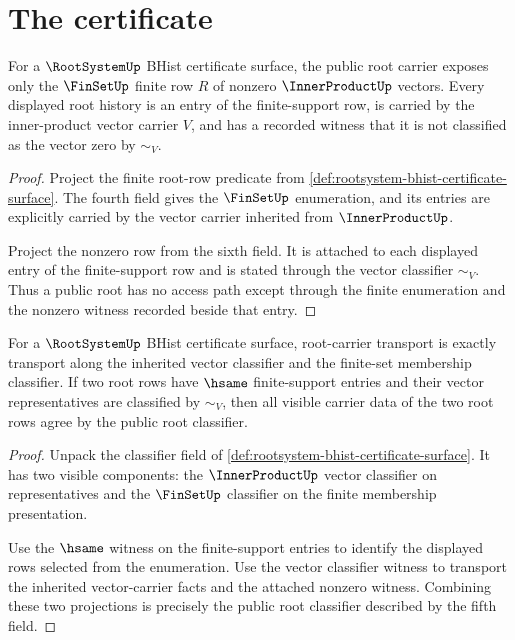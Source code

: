 \section{The certificate}
\label{sec:rootsystem-certificate}

\begin{theorem}
\label{thm:rootsystem-nonzero-finiteness-obligation}
For a $\RootSystemUp$ BHist certificate surface, the public root carrier
exposes only the $\FinSetUp$ finite row $R$ of nonzero
$\InnerProductUp$ vectors. Every displayed root history is an entry of the
finite-support row, is carried by the inner-product vector carrier $V$, and
has a recorded witness that it is not classified as the vector zero by
$\sim_V$.
\end{theorem}
\begin{proof}
Project the finite root-row predicate from
\autoref{def:rootsystem-bhist-certificate-surface}. The fourth field gives
the $\FinSetUp$ enumeration, and its entries are explicitly carried by the
vector carrier inherited from $\InnerProductUp$.

Project the nonzero row from the sixth field. It is attached to each displayed
entry of the finite-support row and is stated through the vector classifier
$\sim_V$. Thus a public root has no access path except through the finite
enumeration and the nonzero witness recorded beside that entry.
\end{proof}

\begin{theorem}
\label{thm:rootsystem-carrier-classifier-obligation}
For a $\RootSystemUp$ BHist certificate surface, root-carrier transport is
exactly transport along the inherited vector classifier and the finite-set
membership classifier. If two root rows have $\hsame$ finite-support entries
and their vector representatives are classified by $\sim_V$, then all visible
carrier data of the two root rows agree by the public root classifier.
\end{theorem}
\begin{proof}
Unpack the classifier field of
\autoref{def:rootsystem-bhist-certificate-surface}. It has two visible
components: the $\InnerProductUp$ vector classifier on representatives and
the $\FinSetUp$ classifier on the finite membership presentation.

Use the $\hsame$ witness on the finite-support entries to identify the
displayed rows selected from the enumeration. Use the vector classifier
witness to transport the inherited vector-carrier facts and the attached
nonzero witness. Combining these two projections is precisely the public
root classifier described by the fifth field.
\end{proof}

